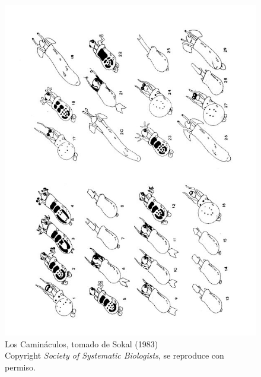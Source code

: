 \begin{figure}
\centering
\includegraphics[scale=0.75]{./practica01/cami0.jpg}
\caption{Los Camin\'aculos, tomado de Sokal (1983) \\Copyright \textit{Society of Systematic Biologists}, se reproduce con permiso.}
\end{figure}


